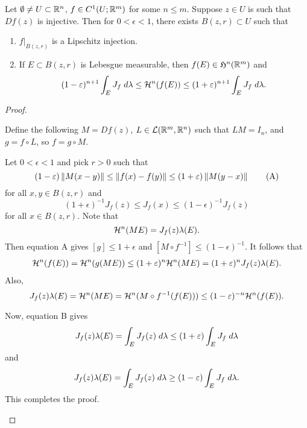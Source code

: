\documentclass[a4paper]{article}
\begin{document}
\begin{lemma}
Let $\emptyset \neq U \subset \mathbb{R}^n$, $f \in C^1 (U ; \mathbb{R}^m)$
for some $n \leq m$. Suppose $z \in U$ is such that 
$Df(z)$ is injective. Then for $0 < \epsilon < 1$, there 
exists $B(z, r) \subset U$ such that 
\begin{enumerate}
\item $f \vert_{B(z, r)}$ is a Lipschitz injection.
\item If $E \subset B(z, r)$ is Lebesgue measurable, 
then $f(E) \in \mathfrak{H}^n (\mathbb{R}^m)$ and 
\[
(1 - \varepsilon)^{n+1} 
\int_E J_f \; d \lambda 
\leq \mathcal{H}^n (f(E)) \leq 
(1 + \varepsilon)^{n+1} \int_E J_f \; d \lambda.
\]
\end{enumerate}
\end{lemma}

\begin{proof}
\begin{enumerate}
Define the following $M = Df(z)$, $L \in \mathcal{L}(\mathbb{R}^m, \mathbb{R}^n)$
such that $L M = I_n$, and $g = f \circ L$, so $f = g \circ M$.

Let $0 < \epsilon < 1$ and pick $r > 0$ such that 
\begin{equation*}
  (1 - \varepsilon) \left\lVert M (x - y)\right\rVert 
  \leq \left\lVert f(x) - f(y)\right\rVert \leq 
  (1 + \varepsilon) \left\lVert M (y - x)\right\rVert
  \tag{A}
\end{equation*}
for all $x, y \in B(z, r)$ 
and 
\begin{equation*}
  (1 + \epsilon)^{-1} J_f(z) 
  \leq J_f(x) \leq
  (1 - \epsilon)^{-1} J_f(z)
  \tag{B}
\end{equation*}
for all $x \in B(z, r)$. Note that 
\[
\mathcal{H}^n (ME) = J_f(z) \lambda(E). 
\]
Then equation A gives $[g] \leq 1 + \epsilon$ and 
$[M \circ f^{-1}] \leq (1 - \epsilon)^{-1}$. 
It follows that 
\[
\begin{aligned}
\mathcal{H}^n (f(E)) = \mathcal{H}^n(g(ME)) 
\leq (1 + \varepsilon)^n \mathcal{H}^n (ME) 
= (1 + \varepsilon)^n J_f(z) \lambda(E).
\end{aligned}
\]
Also, 
\[
J_f(z) \lambda (E) = \mathcal{H}^n (ME) 
= \mathcal{H}^n (M \circ f^{-1} (f(E))) 
\leq (1 - \varepsilon)^{-n} \mathcal{H}^n (f(E)).
\]

Now, equation B gives 
\[
J_f(z) \lambda(E) 
= \int_E J_f(z) \; d \lambda 
\leq (1 + \varepsilon) \int_E J_f \; d \lambda
\]
and 
\[
J_f(z) \lambda(E)
= \int_E J_f(z) \; d \lambda 
\geq (1 - \varepsilon) \int_E J_f \; d \lambda.
\]
This completes the proof.

\end{enumerate}
\end{proof}
\end{document}
